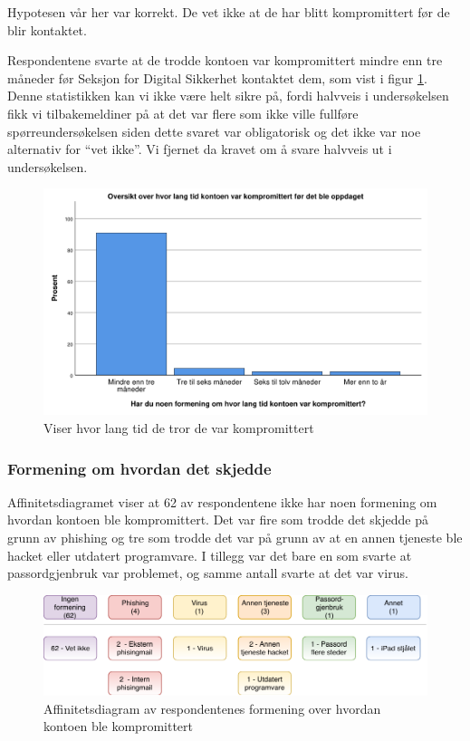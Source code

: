 Hypotesen vår her var korrekt. De vet ikke at de har blitt kompromittert før de blir kontaktet.

Respondentene svarte at de trodde kontoen var kompromittert mindre enn tre måneder før Seksjon for Digital Sikkerhet kontaktet dem, som vist i figur \ref{fig:fant-ut-kompromittert}. Denne statistikken kan vi ikke være helt sikre på, fordi halvveis i undersøkelsen fikk vi tilbakemeldiner på at det var flere som ikke ville fullføre spørreundersøkelsen siden dette svaret var obligatorisk og det ikke var noe alternativ for ``vet ikke''. Vi fjernet da kravet om å svare halvveis ut i undersøkelsen.
\begin{figure}[H]
    \centering
    \includegraphics[scale=0.5]{case_2/bilder/spss/lang_tid_konto_kompromittert.pdf}
    \caption[Hvor lang tid de tror de var kompromittert]{Viser hvor lang tid de tror de var kompromittert}
    \label{fig:fant-ut-kompromittert}
\end{figure}

\subsubsection{Formening om hvordan det skjedde}
Affinitetsdiagramet viser at 62 av respondentene ikke har noen formening om hvordan kontoen ble kompromittert. Det var fire som trodde det skjedde på grunn av phishing og tre som trodde det var på grunn av at en annen tjeneste ble hacket eller utdatert programvare. I tillegg var det bare en som svarte at passordgjenbruk var problemet, og samme antall svarte at det var virus. 
\begin{figure}[H]
    \centering
    \includegraphics[scale=0.8]{case_2/bilder/Affinitetsdiagram.pdf}
    \caption[Affinitetsdiagram av formening om hvordan det skjedde]{Affinitetsdiagram av respondentenes formening over hvordan kontoen ble kompromittert}
    \label{fig:case2-affinitetsdiagram}
\end{figure}

